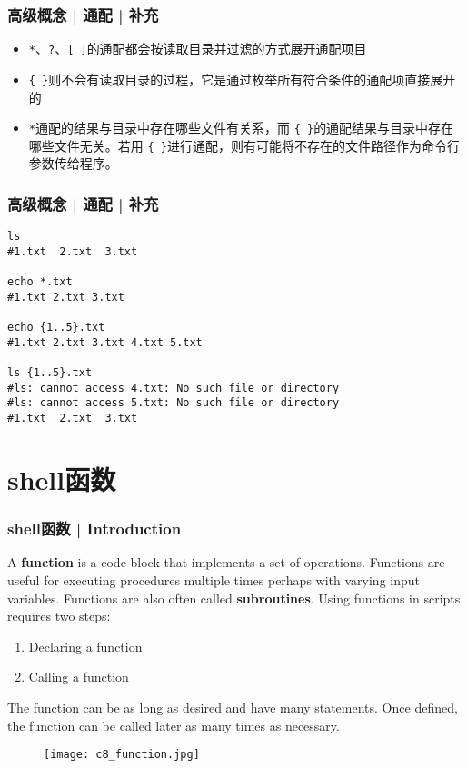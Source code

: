 \begin{frame}[fragile]
  \frametitle{高级概念 | 通配 | 补充}
  \begin{itemize}
    \item \verb|*|、\verb|?|、\verb|[ ]|的通配都会按读取目录并过滤的方式展开通配项目
    \item \verb|{ }|则不会有读取目录的过程，它是通过枚举所有符合条件的通配项直接展开的
    \item \verb|*|通配的结果与目录中存在哪些文件有关系，而 \verb|{ }|的通配结果与目录中存在哪些文件无关。若用 \verb|{ }|进行通配，则有可能将不存在的文件路径作为命令行参数传给程序。
  \end{itemize}
\end{frame}

\begin{frame}[fragile]
  \frametitle{高级概念 | 通配 | 补充}
\begin{lstlisting}
ls
#1.txt  2.txt  3.txt

echo *.txt
#1.txt 2.txt 3.txt

echo {1..5}.txt
#1.txt 2.txt 3.txt 4.txt 5.txt

ls {1..5}.txt
#ls: cannot access 4.txt: No such file or directory
#ls: cannot access 5.txt: No such file or directory
#1.txt  2.txt  3.txt
\end{lstlisting}
\end{frame}

\section{shell函数}
\begin{frame}
  \frametitle{shell函数 | Introduction}
  A \textbf{function} is a code block that implements a set of operations.  Functions are useful for executing procedures multiple times perhaps with varying input variables. Functions are also often called \textbf{subroutines}. Using functions in scripts requires two steps:
  \begin{enumerate}
    \item Declaring a function
    \item Calling a function
  \end{enumerate}
  The function can be as long as desired and have many statements. Once defined, the function can be called later as many times as necessary.
  \begin{figure}
    \centering
    \texttt{[image: c8\_function.jpg]}
  \end{figure}
\end{frame}

